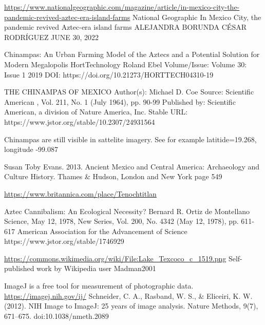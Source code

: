 \documentclass[12pt]{iopart}
\begin{document}
\begin{thebibliography}{99}
\url{https://www.nationalgeographic.com/magazine/article/in-mexico-city-the-pandemic-revived-aztec-era-island-farms}
National Geographic
In Mexico City, the pandemic revived Aztec-era island farms
ALEJANDRA BORUNDA
CÉSAR RODRÍGUEZ
JUNE 30, 2022

Chinampas: An Urban Farming Model of the Aztecs and a Potential Solution for Modern Megalopolis
HortTechnology
Roland Ebel
Volume/Issue: Volume 30: Issue 1
2019
DOI: https://doi.org/10.21273/HORTTECH04310-19

THE CHINAMPAS OF MEXICO
Author(s): Michael D. Coe
Source: Scientific American , Vol. 211, No. 1 (July 1964), pp. 90-99
Published by: Scientific American, a division of Nature America, Inc.
Stable URL: https://www.jstor.org/stable/10.2307/24931564

Chinampas are still visible in sattelite imagery.  See for example latitide=19.268, longitude -99.087

Susan Toby Evans. 
2013. 
Ancient Mexico and Central America: Archaeology and Culture History. 
Thames \& Hudson, London and New York
page 549

\url{https://www.britannica.com/place/Tenochtitlan}

Aztec Cannibalism: An Ecological Necessity?
Bernard R. Ortiz de Montellano
Science, May 12, 1978, New Series, Vol. 200, No. 4342 (May 12, 1978), pp. 611-617
American Association for the Advancement of Science
https://www.jstor.org/stable/1746929

\url{https://commons.wikimedia.org/wiki/File:Lake\_Texcoco\_c\_1519.png}
Self-published work by Wikipedia user Madman2001


ImageJ is a free tool for measurement of photographic data.  
\url{https://imagej.nih.gov/ij/}
Schneider, C. A., Rasband, W. S., \& Eliceiri, K. W. (2012). NIH Image to ImageJ: 25 years of image analysis. Nature Methods, 9(7), 671–675. doi:10.1038/nmeth.2089
\end{thebibliography}
\end{document}
